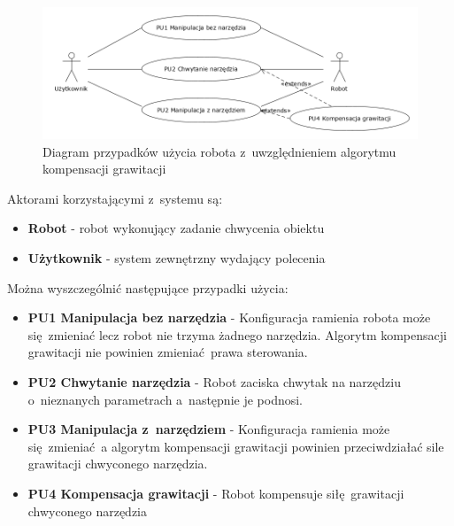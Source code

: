 \begin{figure}[H]
	\centering
	\includegraphics[width=.9\textwidth]{images/usecase.png}
	\caption{Diagram przypadków użycia robota z~uwzględnieniem algorytmu kompensacji grawitacji}
	\label{fig:usecase}
\end{figure}


Aktorami korzystającymi z~systemu są:
\begin{itemize}
	\item \textbf{Robot} - robot wykonujący zadanie chwycenia obiektu
	\item \textbf{Użytkownik} - system zewnętrzny wydający polecenia
\end{itemize}


Można wyszczególnić następujące przypadki użycia:
\begin{itemize}
	\item \textbf{PU1 Manipulacja bez narzędzia} - Konfiguracja ramienia robota może się zmieniać lecz robot nie trzyma żadnego narzędzia. Algorytm kompensacji grawitacji nie powinien zmieniać prawa sterowania. 
	\item \textbf{PU2 Chwytanie narzędzia} - Robot zaciska chwytak na narzędziu o~nieznanych parametrach a~następnie je podnosi.  
	\item \textbf{PU3 Manipulacja z~narzędziem} - Konfiguracja ramienia może się zmieniać a algorytm kompensacji grawitacji powinien przeciwdziałać sile grawitacji chwyconego narzędzia.
	\item \textbf{PU4 Kompensacja grawitacji} - Robot kompensuje siłę grawitacji chwyconego narzędzia
\end{itemize}



